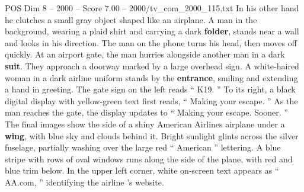 \begin{textsample}{POS Dim 8 – 2000 – Score 7.00 – 2000/tv\_com\_2000\_115.txt}
In his other hand he clutches a small gray object shaped like an airplane.
A man in the background, wearing a plaid shirt and carrying a dark \textbf{folder}, stands near a wall and looks in his direction.
The man on the phone turns his head, then moves off quickly.
At an airport gate, the man hurries alongside another man in a dark \textbf{suit}.
They approach a doorway marked by a large overhead sign.
A white-haired woman in a dark airline uniform stands by the \textbf{entrance}, smiling and extending a hand in greeting.
The gate sign on the left reads “ K19. ” To its right, a black digital display with yellow-green text first reads, “ Making your escape. ” As the man reaches the gate, the display updates to “ Making your escape.
Sooner. ” The final images show the side of a shiny American Airlines airplane under a \textbf{wing}, with blue sky and clouds behind it.
Bright sunlight glints across the silver fuselage, partially washing over the large red “ American ” lettering.
A blue stripe with rows of oval windows runs along the side of the plane, with red and blue trim below.
In the upper left corner, white on-screen text appears as “ AA.com, ” identifying the airline ’s website.

\end{textsample}
